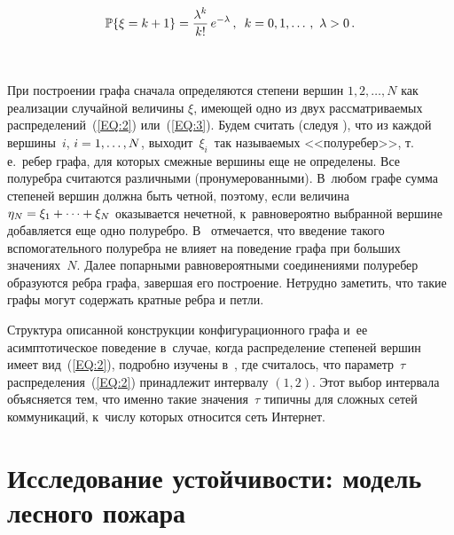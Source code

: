 \begin{multicols}{2}
\noindent
\begin{equation}
\label{EQ:3}
\mathbb{P}\{\xi = k+1\} = \displaystyle\frac{\displaystyle \lambda^k\mathstrut}{\displaystyle k!\mathstrut}\, e^{-\lambda}\,, \enskip
k=0,1,\ldots\,, \ \lambda > 0\,.
\end{equation}

\begin{figure*}[b] %
 \vspace*{1pt}
 \begin{center}
 \mbox{%
 \epsfxsize=146.199mm
 }
\end{center}
 \vspace*{-9pt}
\end{figure*}

При построении графа сначала определяются степени вершин $1,2,\ldots,N$ как
реализации случайной величины $\xi$, имеющей одно из двух рассматриваемых
распределений~(\ref{EQ:2}) или~(\ref{EQ:3}). Будем считать (следуя \cite{RN1}), что из каждой
вершины~$i$, $i\hm=1,\ldots,N$, выходит~$\xi_i$~так называемых <<по\-лу\-ре\-бер>>,
т.\,е.\ ре\-бер графа, для которых смежные вершины еще не определены.
Все по\-лу\-реб\-ра считаются
различными (пронумерованными). В~любом графе сумма степеней вершин должна быть четной,
поэтому, если величина $\eta_N\hm=\xi_1+\cdots +\xi_N$ оказывается нечетной,
к~равновероятно
выбранной вершине добавляется еще одно по\-лу\-реб\-ро. В~\cite{RN1} отмечается, что
введение такого вспомогательного по\-лу\-реб\-ра не влияет на поведение графа
при больших значениях~$N$. Далее попарными равновероятными соединениями по\-лу\-ре\-бер
образуются реб\-ра графа, завершая его построение. Нетрудно заметить, что такие
графы могут содержать кратные реб\-ра и петли.

Структура описанной конструкции конфигурационного графа и~ее
асимптотическое поведение в~случае, когда распределение степеней вершин имеет
вид~(\ref{EQ:2}), подробно изучены в~\cite{RN1}, где считалось, что параметр~$\tau$
распределения~(\ref{EQ:2}) принадлежит интервалу $(1,2)$. Этот выбор интервала
объясняется тем, что именно такие значения~$\tau$ типичны для сложных
сетей коммуникаций, к~чис\-лу которых относится сеть Интернет.

\vspace*{-4pt}

\section{Исследование устойчивости: модель лесного пожара}


\end{multicols}
